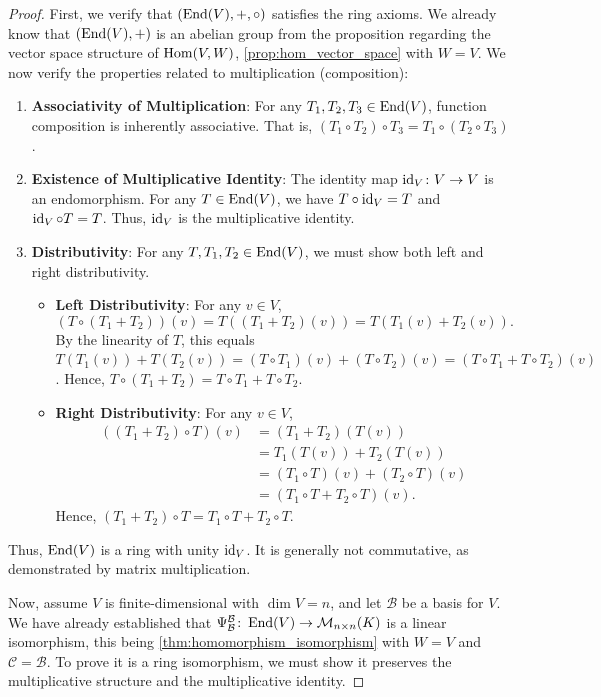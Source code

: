 \begin{proof}
  First, we verify that $(\operatorname{End}(V), +, \circ)$ satisfies the ring axioms. We already know that $(\operatorname{End}(V), +)$ is an abelian group from the proposition regarding the vector space structure of $\operatorname{Hom}(V,W)$, \cref{prop:hom_vector_space} with $W = V$. We now verify the properties related to multiplication (composition):
  \begin{enumerate}
    \item \textbf{Associativity of Multiplication}: For any $T_1, T_2, T_3 \in \operatorname{End}(V)$, function composition is inherently associative. That is, $(T_1 \circ T_2) \circ T_3 = T_1 \circ (T_2 \circ T_3)$.
    \item \textbf{Existence of Multiplicative Identity}: The identity map $\operatorname{id}_V \colon V \to V$ is an endomorphism. For any $T \in \operatorname{End}(V)$, we have $T \circ \operatorname{id}_V = T$ and $\operatorname{id}_V \circ T = T$. Thus, $\operatorname{id}_V$ is the multiplicative identity.
    \item \textbf{Distributivity}: For any $T, T_1, T_2 \in \operatorname{End}(V)$, we must show both left and right distributivity.
    \begin{itemize}
      \item \textbf{Left Distributivity}: For any $v \in V$,
      \[ (T \circ (T_1 + T_2))(v) = T((T_1 + T_2)(v)) = T(T_1(v) + T_2(v)). \]
      By the linearity of $T$, this equals $T(T_1(v)) + T(T_2(v)) = (T \circ T_1)(v) + (T \circ T_2)(v) = (T \circ T_1 + T \circ T_2)(v)$.
      Hence, $T \circ (T_1 + T_2) = T \circ T_1 + T \circ T_2$.
      \item \textbf{Right Distributivity}: For any $v \in V$,
      \begin{align*}
        ((T_1 + T_2) \circ T)(v) &= (T_1 + T_2)(T(v)) \\
        &= T_1(T(v)) + T_2(T(v)) \\
        &= (T_1 \circ T)(v) + (T_2 \circ T)(v) \\
        &= (T_1 \circ T + T_2 \circ T)(v).
      \end{align*}
      Hence, $(T_1 + T_2) \circ T = T_1 \circ T + T_2 \circ T$.
    \end{itemize}
  \end{enumerate}
  Thus, $\operatorname{End}(V)$ is a ring with unity $\operatorname{id}_V$. It is generally not commutative, as demonstrated by matrix multiplication.

  Now, assume $V$ is finite-dimensional with $\dim V = n$, and let $\mathcal{B}$ be a basis for $V$. We have already established that $\Psi_{\mathcal{B}}^{\mathcal{B}} \colon \operatorname{End}(V) \to \mathcal{M}_{n \times n}(K)$ is a linear isomorphism, this being \cref{thm:homomorphism_isomorphism} with $W = V$ and $\mathcal{C} = \mathcal{B}$. To prove it is a ring isomorphism, we must show it preserves the multiplicative structure and the multiplicative identity.


\end{proof}

